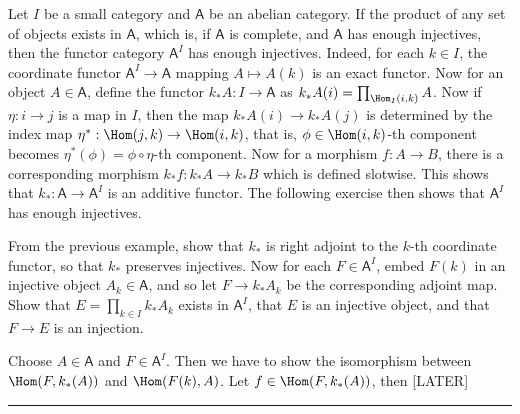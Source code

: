\begin{exmp} Let $I$ be a small category and $\mathsf{A}$ be an abelian category. If the product of any set of objects exists in $\mathsf{A}$, which is, if $\mathsf{A}$ is complete, and $\mathsf{A}$ has enough injectives, then the functor category $\mathsf{A}^I$ has enough injectives. Indeed, for each $k\in I$, the coordinate functor $\mathsf{A}^I\rightarrow \mathsf{A}$ mapping $A\mapsto A(k)$ is an exact functor. Now for an object $A\in \mathsf{A}$, define the functor $k_*A:I\rightarrow \mathsf{A}$ as $k_*A(i)=\prod_{\Hom_I(i,k)}A$. Now if $\eta:i\rightarrow j$ is a map in $I$, then the map $k_*A(i)\rightarrow k_*A(j)$ is determined by the index map $\eta^*:\Hom(j,k)\rightarrow \Hom(i,k)$, that is, $\phi\in \Hom(i,k)$-th component becomes $\eta^*(\phi)=\phi\circ \eta$-th component. Now for a morphism $f:A\rightarrow B$, there is a corresponding morphism $k_*f:k_*A\rightarrow k_*B$ which is defined slotwise. This shows that $k_*:\mathsf{A}\rightarrow \mathsf{A}^I$ is an additive functor. The following exercise then shows that $\mathsf{A}^I$ has enough injectives.
\end{exmp}

\begin{exer} From the previous example, show that $k_*$ is right adjoint to the $k$-th coordinate functor, so that $k_*$ preserves injectives. Now for each $F\in \mathsf{A}^I$, embed $F(k)$ in an injective object $A_k\in \mathsf{A}$, and so let $F\rightarrow k_* A_k$ be the corresponding adjoint map. Show that $E=\prod_{k\in I}k_* A_k$ exists in $\mathsf{A}^I$, that $E$ is an injective object, and that $F\rightarrow E$ is an injection.
\end{exer}
\begin{solution}
Choose $A\in \mathsf{A}$ and $F\in \mathsf{A}^I$. Then we have to show the isomorphism between $\Hom(F,k_*(A))$ and $\Hom(F(k),A)$. Let $f\in \Hom(F,k_*(A))$, then [LATER]
\end{solution}
\noindent\rule{\textwidth}{1pt}
\newline